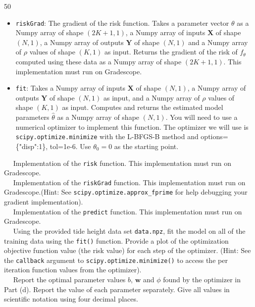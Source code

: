 \documentclass[11pt]{article}
\newcommand{\mbf}[1]{{\mathbf{#1}}}
\begin{document}
\begin{problem}{50}
\begin{itemize}
        \item \verb|riskGrad|: The gradient of the risk function. Takes a parameter vector $\theta$ as a Numpy array of shape $(2K+1,1)$, a Numpy array of inputs $\mbf{X}$ of shape $(N, 1)$, a Numpy array of outputs $\mbf{Y}$ of shape $(N, 1)$ and a Numpy array of $\rho$ values of shape $(K,1)$ as input. Returns the gradient of the risk of $f_{\theta}$ computed using these data as a Numpy array of shape $(2K+1,1)$. This implementation must run on Gradescope.     
        
        \item \verb|fit|: Takes a Numpy array of inputs $\mbf{X}$ of shape $(N, 1)$, a Numpy array of outputs $\mbf{Y}$ of shape $(N, 1)$ as input, and a Numpy array of $\rho$ values of shape $(K,1)$ as input. Computes and returns the estimated model parameters $\hat{\theta}$ as a Numpy array of shape $(N, 1)$. You will need to use a numerical optimizer to implement this function. The optimizer we will use is \verb|scipy.optimize.minimize| with the L-BFGS-B method and  options=\{"disp":1\}, tol=1e-6. Use $\theta_0=0$ as the starting point.
        
\end{itemize}
    
    ~~ Implementation of the \verb|risk| function. This implementation must run on Gradescope.\\

    ~~ Implementation of the \verb|riskGrad| function. This implementation must run on Gradescope.(Hint: See \verb|scipy.optimize.approx_fprime| for help debugging your gradient implementation).\\

    ~~ Implementation of the \verb|predict| function. This implementation must run on Gradescope.\\
    
    ~~ Using the provided tide height data set \verb|data.npz|, fit the model
    on all of the training data using the \verb|fit()| function. Provide a plot of the optimization objective function value (the risk value) for each step of the optimizer. (Hint: See the \verb|callback| argument to \verb|scipy.optimize.minimize()| to access the per iteration function values from the optimizer).\\
    
    ~~ Report the optimal parameter values $b$, $\mbf{w}$ and $\phi$ found by the optimizer in Part (d). Report the value of each parameter separately. Give all values in scientific notation using four decimal places.\\
    

\end{problem}
\end{document}
